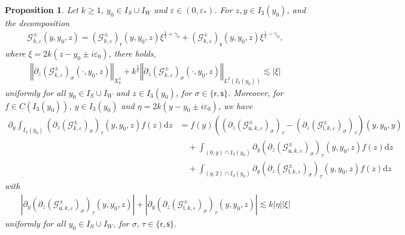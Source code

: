 \documentclass[11pt,reqno]{amsproc}
\newtheorem{proposition}{Proposition}[section]
\theoremstyle{definition}
\numberwithin{equation}{section}
\newcommand{\G}{{\mathcal{G}}}
\newcommand{\sr}{{\mathsf{r}}}
\newcommand{\s}{{\mathsf{s}}}
\newcommand{\su}{{\mathsf{u}}}
\renewcommand{\sl}{{\mathsf{l}}}
\renewcommand{\d}{\mathrm{d}}
\newcommand{\ep}{\varepsilon}
\begin{document}
\begin{proposition}\label{prop:sobolevregpartialdecomG}
Let $k\geq 1$, $y_0\in I_S\cup I_W$ and $\ep\in (0,\ep_*)$. For $z,y\in I_3(y_0)$, and the decomposition
\begin{align*}
\G_{k,\ep}^\pm(y,y_0,z) = \left( \G_{k,\ep}^\pm\right)_\sr(y,y_0,z) \xi^{\frac12 + \gamma_0} + \left( \G_{k,\ep}^\pm\right)_\s(y,y_0,z) \xi^{\frac12 - \gamma_0},
\end{align*}
where $\xi=2k(z-y_0\pm i\ep_0)$, there holds, 
\begin{align*}
\left\Vert \partial_z\left( \G_{k,\ep}^\pm\right)_\sigma(\cdot,y_0,z) \right\Vert_{X_k^1} + k^\frac12 \left\Vert \partial_z\left( \G_{k,\ep}^\pm \right)_\sigma(\cdot,y_0,z) \right \Vert_{L^2(I_3(y_0))}\lesssim |\xi|
\end{align*}
uniformly for all $y_0\in I_S\cup I_W$ and $z\in I_3(y_0)$, for $\sigma\in \lbrace \sr, \s \rbrace$. Moreover, for $f\in C(I_3(y_0))$, $y\in I_3(y_0)$ and $\eta=2k(y-y_0\pm i\ep_0)$, we have
\begin{align*}
\partial_y \int_{I_3(y_0)} \left( \partial_z \left( \G_{k,\ep}^\pm \right)_\sigma  \right)_\tau (y,y_0,z) f(z) \d z &= f(y) \left( \left( \partial_z \left( \G_{\su,k,\ep}^\pm \right)_\sigma \right)_\tau - \left( \partial_z \left( \G_{\sl,k,\ep}^\pm \right)_\sigma \right)_\tau \right)(y,y_0,y)  \\
&\quad + \int_{(0,y)\cap I_3(y_0)} \partial_y \left( \partial_z \left( \G_{\su,k,\ep}^\pm \right)_\sigma  \right)_\tau (y,y_0,z) f(z) \d z \\
&\quad + \int_{(y,2)\cap I_3(y_0)} \partial_y \left( \partial_z \left( \G_{\sl,k,\ep}^\pm \right)_\sigma  \right)_\tau (y,y_0,z) f(z) \d z
\end{align*}
with
\begin{align*}
\left\vert \partial_y \left( \partial_z \left( \G_{\su,k,\ep}^\pm \right)_\sigma  \right)_\tau(y,y_0,z) \right\vert + \left\vert \partial_y \left( \partial_z \left( \G_{\sl,k,\ep}^\pm \right)_\sigma  \right)_\tau(y,y_0,z) \right\vert \lesssim k |\eta||\xi|
\end{align*}
uniformly for all $y_0\in I_S\cup I_W$, for $\sigma,\,\tau\in \lbrace \sr, \s \rbrace$.
\end{proposition}
\end{document}
